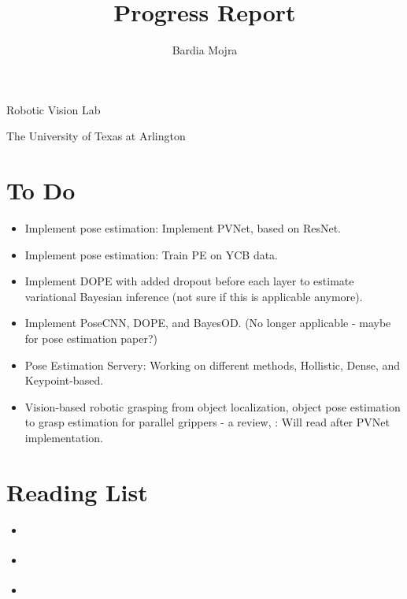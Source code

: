 \documentclass[11pt]{article}
\title{Progress Report}
\author{Bardia Mojra}
\begin{document}
\maketitle
\thispagestyle{empty}

\bigskip
\bigskip
\begin{center}
      Robotic Vision Lab
\end{center}

\begin{center}
      The University of Texas at Arlington
\end{center}

\newpage

\section{To Do}
\begin{itemize}
      \item Implement pose estimation: Implement PVNet, based on ResNet.
      \item Implement pose estimation: Train PE on YCB data.
      \item Implement DOPE with added dropout before each layer to estimate
            variational Bayesian inference (not sure if this is applicable anymore).
      \item Implement PoseCNN, DOPE, and BayesOD. (No longer applicable - maybe
      for pose estimation paper?)
      \item Pose Estimation Servery: Working on different methods, Hollistic,
      Dense, and Keypoint-based.
      \item Vision-based robotic grasping from object localization, object pose
      estimation to grasp estimation for parallel grippers - a review,
      \cite{du2020vision}: Will read after PVNet implementation.
\end{itemize}

\section{Reading List}
\begin{itemize}
      \item \cite{du2020vision}
      \item \cite{he2015deep}
      \item \cite{ferraz2014leveraging}
\end{itemize}
\end{document}
